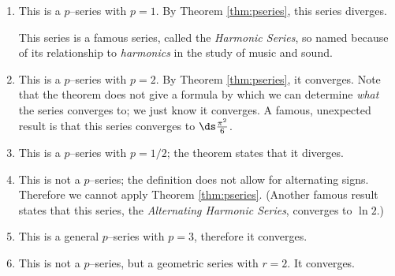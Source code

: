 {\begin{enumerate}
\item		This is a $p$--series with $p=1$. By Theorem \ref{thm:pseries}, this series diverges. 

This series is a famous series, called the \emph{Harmonic Series}, so named because of its relationship to \emph{harmonics} in the study of music and sound. 

\item		This is a $p$--series with $p=2$. By Theorem \ref{thm:pseries}, it converges. Note that the theorem does not give a formula by which we can determine \emph{what} the series converges to; we just know it converges. A famous, unexpected result is that this series converges to $\ds\frac{\pi^2}{6}$.

\item		This is a $p$--series with $p=1/2$; the theorem states that it diverges.

\item		This is not a $p$--series; the definition does not allow for alternating signs. Therefore we cannot apply Theorem \ref{thm:pseries}. (Another famous result states that this series, the \emph{Alternating Harmonic Series}, converges to $\ln 2$.)

\item		This is a general $p$--series with $p=3$, therefore it converges.

\item		This is not a $p$--series, but a geometric series with $r=2$. It converges.
\end{enumerate}
\baselineskip
}\\

